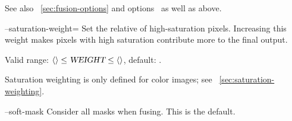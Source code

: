 \begin{codelist}
  See also \sectionName~\ref{sec:fusion-options} and
  options~ as well as
   above.


  \label{opt:saturation-weight}%
\item[--saturation-weight=\metavar{WEIGHT}]\itemend
  Set the relative  of high-saturation pixels.  Increasing this weight makes
  pixels with high saturation contribute more to the final output.

  Valid range: $\val{val:minimum-weight-saturation} \leq \metavar{WEIGHT} \leq
  \val{val:maximum-weight-saturation}$, default: .

  Saturation weighting is only defined for color images; see
  \sectionName~\ref{sec:saturation-weighting}.


  \label{opt:soft-mask}%
\item[--soft-mask]\itemend
  Consider all masks when fusing.  This is the default.
\end{codelist}




